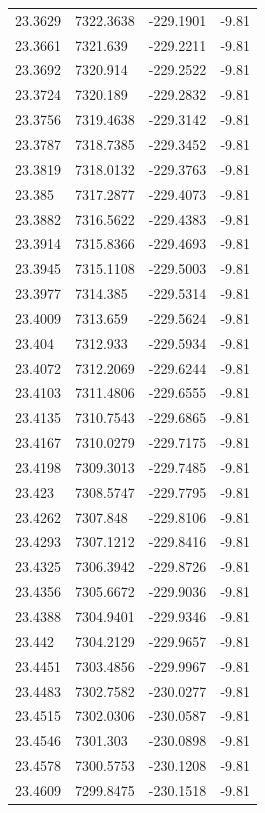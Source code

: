 \begin{table}[H]
\begin{tabular}{llll}
23.3629 & 7322.3638 & -229.1901 & -9.81 \\
23.3661 & 7321.639 & -229.2211 & -9.81 \\
23.3692 & 7320.914 & -229.2522 & -9.81 \\
23.3724 & 7320.189 & -229.2832 & -9.81 \\
23.3756 & 7319.4638 & -229.3142 & -9.81 \\
23.3787 & 7318.7385 & -229.3452 & -9.81 \\
23.3819 & 7318.0132 & -229.3763 & -9.81 \\
23.385 & 7317.2877 & -229.4073 & -9.81 \\
23.3882 & 7316.5622 & -229.4383 & -9.81 \\
23.3914 & 7315.8366 & -229.4693 & -9.81 \\
23.3945 & 7315.1108 & -229.5003 & -9.81 \\
23.3977 & 7314.385 & -229.5314 & -9.81 \\
23.4009 & 7313.659 & -229.5624 & -9.81 \\
23.404 & 7312.933 & -229.5934 & -9.81 \\
23.4072 & 7312.2069 & -229.6244 & -9.81 \\
23.4103 & 7311.4806 & -229.6555 & -9.81 \\
23.4135 & 7310.7543 & -229.6865 & -9.81 \\
23.4167 & 7310.0279 & -229.7175 & -9.81 \\
23.4198 & 7309.3013 & -229.7485 & -9.81 \\
23.423 & 7308.5747 & -229.7795 & -9.81 \\
23.4262 & 7307.848 & -229.8106 & -9.81 \\
23.4293 & 7307.1212 & -229.8416 & -9.81 \\
23.4325 & 7306.3942 & -229.8726 & -9.81 \\
23.4356 & 7305.6672 & -229.9036 & -9.81 \\
23.4388 & 7304.9401 & -229.9346 & -9.81 \\
23.442 & 7304.2129 & -229.9657 & -9.81 \\
23.4451 & 7303.4856 & -229.9967 & -9.81 \\
23.4483 & 7302.7582 & -230.0277 & -9.81 \\
23.4515 & 7302.0306 & -230.0587 & -9.81 \\
23.4546 & 7301.303 & -230.0898 & -9.81 \\
23.4578 & 7300.5753 & -230.1208 & -9.81 \\
23.4609 & 7299.8475 & -230.1518 & -9.81 \\

\end{tabular}
\end{table}
